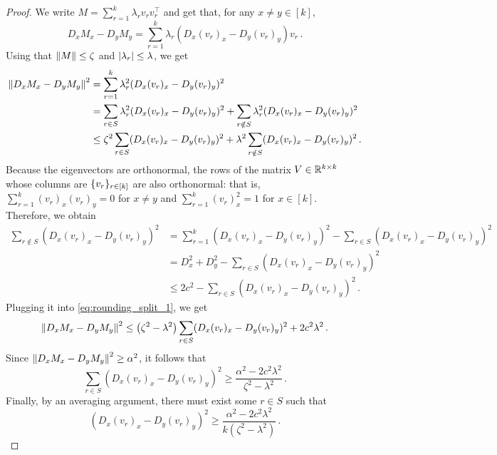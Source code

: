 \begin{proof}
    We write $M = \sum_{r=1}^k \lambda_r v_r v_r^{\top}$ and get that, for any $x \neq y \in [k]$,
    \begin{equation*}
        D_x M_x - D_y M_y=\sum_{r=1}^k \lambda_r (D_x (v_r)_x - D_y (v_r)_y)v_r \,.
    \end{equation*}
    Using that $\left\lVert M\right\rVert\leq \zeta$ and $\left\lvert\lambda_r\right\rvert\leq \lambda$, we get
    \begin{align}
    \label{eq:rounding_split_1}
        \begin{split}
            \Norm{D_x M_x- D_y M_y}^2
            &=\sum_{r=1}^k \lambda_r^2 (D_x (v_r)_x - D_y(v_r)_y)^2 \\
            &=\sum_{r\in S} \lambda_r^2 (D_x (v_r)_x - D_y(v_r)_y)^2+\sum_{r\notin S} \lambda_r^2 (D_x (v_r)_x - D_y(v_r)_y)^2 \\
            &\leq \zeta^2\sum_{r\in S} (D_x (v_r)_x- D_y (v_r)_y)^2+\lambda^2\sum_{r\notin S} (D_x (v_r)_x- D_y (v_r)_y)^2 \,.
        \end{split}
    \end{align}
    Because the eigenvectors are orthonormal, the rows of the matrix $V \in {\mathbb R}^{k \times k}$ whose columns are $\{v_{r}\}_{r \in [k]}$ are also orthonormal: that is, $\sum_{r=1}^{k} (v_r)_x (v_r)_y = 0$ for $x \neq y$ and $\sum_{r=1}^{k} (v_r)_x^2 = 1$ for $x \in [k]$.
    Therefore, we obtain
    \begin{align*}
        \sum_{r \notin S} (D_x (v_r)_x- D_y (v_r)_y)^2
        & = \sum_{r=1}^k (D_x (v_r)_x- D_y (v_r)_y)^2 - \sum_{r \in S} (D_x (v_r)_x- D_y (v_r)_y)^2 \\
        & = D_x^2 + D_y^2 - \sum_{r \in S} (D_x (v_r)_x- D_y (v_r)_y)^2 \\
        & \leq 2c^2 - \sum_{r \in S} (D_x (v_r)_x- D_y (v_r)_y)^2 \,.
    \end{align*}
    Plugging it into \cref{eq:rounding_split_1}, we get
    \begin{equation*}
        \left\lVert D_x M_x- D_y M_y\right\rVert^2
        \leq \left(\zeta^2-\lambda^2\right) \sum_{r \in S} (D_x (v_r)_x- D_y (v_r)_y)^2 + 2 c^2 \lambda^2 \,.
    \end{equation*}
    Since $\left\lVert D_xM_x-D_yM_y\right\rVert^2\geq \alpha^2$, it follows that
    \begin{equation*}
        \sum_{r \in S} (D_x (v_r)_x- D_y (v_r)_y)^2 \geq \frac{\alpha^2 - 2c^2\lambda^2}{\zeta^2-\lambda^2} \,.
    \end{equation*}
    Finally, by an averaging argument, there must exist some $r \in S$ such that
    \begin{equation*}
        (D_x (v_r)_x- D_y (v_r)_y)^2 \geq \frac{\alpha^2 - 2c^2\lambda^2}{k(\zeta^2-\lambda^2)} \,.
    \end{equation*}
\end{proof}

